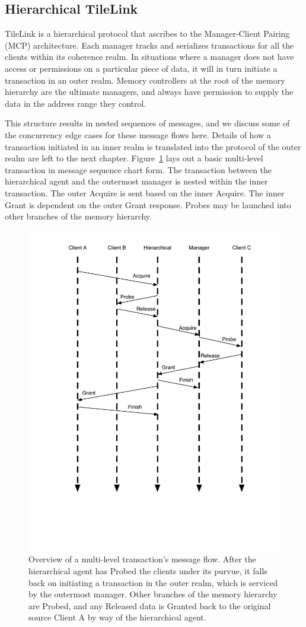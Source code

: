 \subsection{Hierarchical TileLink}

TileLink is a hierarchical protocol that ascribes to the Manager-Client Pairing (MCP) architecture.
Each manager tracks and serializes transactions for all the clients within its coherence realm.
In situations where a manager does not have access or permissions on a particular piece of data,
it will in turn initiate a transaction in an outer realm.
Memory controllers at the root of the memory hierarchy are the ultimate managers, and always have permission
to supply the data in the address range they control.

This structure results in nested sequences of messages, and we discuss some of the concurrency edge cases for these message flows here.
Details of how a transaction initiated in an inner realm is translated into the protocol of the outer realm are left to the next chapter.
Figure~\ref{fig:standard5} lays out a basic multi-level transaction in message sequence chart form.
The transaction between the hierarchical agent and the outermost manager is nested within the inner transaction.
The outer Acquire is sent based on the inner Acquire. 
The inner Grant is dependent on the outer Grant response.
Probes may be launched into other branches of the memory hierarchy.

\begin{figure}[t!]
\centering
\includegraphics[width=0.8\columnwidth]{tilelink/figures/standard5.pdf}
\caption{Overview of a multi-level transaction's message flow.
After the hierarchical agent has Probed the clients under its purvue, it falls back on initiating a transaction in the outer realm,
which is serviced by the outermost manager. Other branches of the memory hierarchy are Probed,
and any Released data is Granted back to the original source Client A by way of the hierarchical agent.
}
\label{fig:standard5}
\end{figure}

